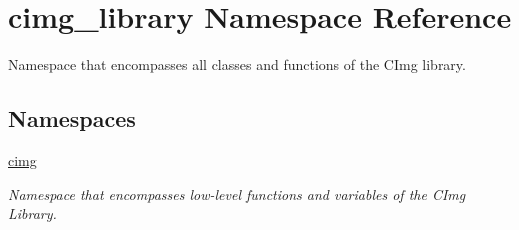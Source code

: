 \hypertarget{namespacecimg__library}{\section{cimg\-\_\-library Namespace Reference}
\label{namespacecimg__library}
}


Namespace that encompasses all classes and functions of the C\-Img library.  


\subsection*{Namespaces}
\begin{DoxyCompactItemize}
\item 
\hyperlink{namespacecimg__library_1_1cimg}{cimg}
\begin{DoxyCompactList}\small\item\em Namespace that encompasses {\itshape low-\/level} functions and variables of the C\-Img Library. \end{DoxyCompactList}\end{DoxyCompactItemize}
